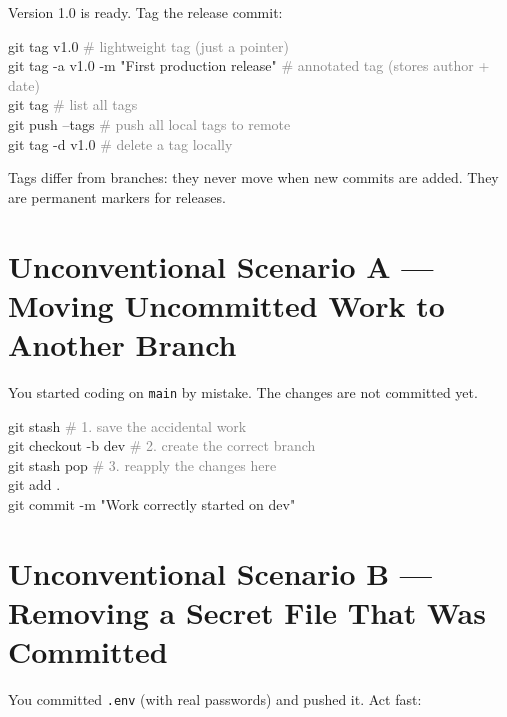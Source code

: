 \documentclass[10pt,a4paper]{article}
\newenvironment{codebox}{%
  \begin{mdframed}[backgroundcolor=codebg, linewidth=0pt,
    innerleftmargin=6pt, innerrightmargin=6pt,
    innertopmargin=4pt, innerbottommargin=4pt]%
  \small\ttfamily
}{%
  \end{mdframed}%
}
\begin{document}
Version 1.0 is ready. Tag the release commit:

\begin{codebox}
git tag v1.0                            \textcolor{gray}{\# lightweight tag (just a pointer)}\\
git tag -a v1.0 -m "First production release"   \textcolor{gray}{\# annotated tag (stores author + date)}\\
git tag                                 \textcolor{gray}{\# list all tags}\\
git push --tags                         \textcolor{gray}{\# push all local tags to remote}\\
git tag -d v1.0                         \textcolor{gray}{\# delete a tag locally}
\end{codebox}

Tags differ from branches: they never move when new commits are added.
They are permanent markers for releases.

\section{Unconventional Scenario A --- Moving Uncommitted Work to Another Branch}

You started coding on \texttt{main} by mistake. The changes are not committed yet.

\begin{codebox}
git stash                   \textcolor{gray}{\# 1. save the accidental work}\\
git checkout -b dev         \textcolor{gray}{\# 2. create the correct branch}\\
git stash pop               \textcolor{gray}{\# 3. reapply the changes here}\\
git add .\\
git commit -m "Work correctly started on dev"
\end{codebox}

\section{Unconventional Scenario B --- Removing a Secret File That Was Committed}

You committed \texttt{.env} (with real passwords) and pushed it. Act fast:
\end{document}
